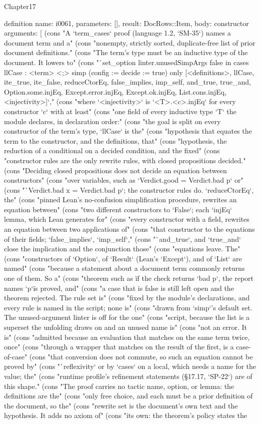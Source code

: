 \begin{lexlean}{Chapter17}
\begin{semanticmodule}
definition{
  name: i0061,
  parameters: [],
  result: DocRows::Item,
  body: constructor{
    arguments: [
      (cons "A `term_cases` proof (language 1.2, `SM-35`) names a document term and a" (cons "nonempty, strictly sorted, duplicate-free list of prior document definitions." (cons "The term's type must be an inductive type of the document. It lowers to" (cons "`set_option linter.unusedSimpArgs false in cases llCase : <term> <;> simp (config := {decide := true}) only [<definitions>, llCase, ite_true, ite_false, reduceCtorEq, false_implies, imp_self, and_true, true_and, Option.some.injEq, Except.error.injEq, Except.ok.injEq, List.cons.injEq, <injectivity>]`," (cons "where `<injectivity>` is `<T>.<c>.injEq` for every constructor `c` with at least" (cons "one field of every inductive type `T` the module declares, in declaration order:" (cons "the goal is split on every constructor of the term's type, `llCase` is the" (cons "hypothesis that equates the term to the constructor, and the definitions, that" (cons "hypothesis, the reduction of a conditional on a decided condition, and the fixed" (cons "constructor rules are the only rewrite rules, with closed propositions decided." (cons "Deciding closed propositions does not decide an equation between constructors" (cons "over variables, such as `Verdict.good = Verdict.bad p` or" (cons "`Verdict.bad x = Verdict.bad p`; the constructor rules do. `reduceCtorEq`, the" (cons "pinned Lean's no-confusion simplification procedure, rewrites an equation between" (cons "two different constructors to `False`; each `injEq` lemma, which Lean generates for" (cons "every constructor with a field, rewrites an equation between two applications of" (cons "that constructor to the equations of their fields; `false_implies`, `imp_self`," (cons "`and_true`, and `true_and` close the implication and the conjunction those" (cons "equations leave. The" (cons "constructors of `Option`, of `Result` (Lean's `Except`), and of `List` are named" (cons "because a statement about a document term commonly returns one of them. So a" (cons "theorem such as \"if the check returns `bad p`, the report names `p`\" is proved, and" (cons "a case that is false is still left open and the theorem rejected. The rule set is" (cons "fixed by the module's declarations, and every rule is named in the script; none is" (cons "drawn from `simp`'s default set. The unused-argument linter is off for the one" (cons "script, because the list is a superset the unfolding draws on and an unused name is" (cons "not an error. It is" (cons "admitted because an evaluation that matches on the same term twice, once" (cons "through a wrapper that matches on the result of the first, is a case-of-case" (cons "that conversion does not commute, so such an equation cannot be proved by" (cons "`reflexivity` or by `cases` on a local, which needs a name for the value; the" (cons "runtime profile's refinement statements (§17.17, `SP-22`) are of this shape." (cons "The proof carries no tactic name, option, or lemma: the definitions are the" (cons "only free choice, and each must be a prior definition of the document, so the" (cons "rewrite set is the document's own text and the hypothesis. It adds no axiom of" (cons "its own: the theorem's policy states the }}
\end{semanticmodule}
\end{lexlean}
